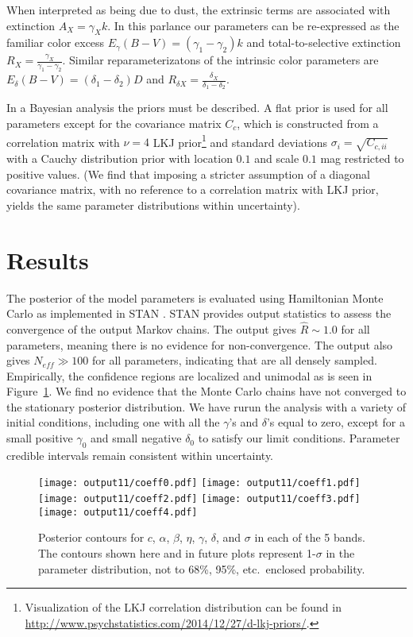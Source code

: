 \documentclass{aastex}   	%
\begin{document}
When interpreted as being due to dust, the extrinsic terms are associated with extinction $A_X = \gamma_X k$.  In
this parlance our parameters can be re-expressed as the  familiar color excess
$E_\gamma(B-V) = (\gamma_1-\gamma_2) k$ and total-to-selective extinction $R_X = \frac{\gamma_X}{\gamma_1-\gamma_2}$.
Similar reparameterizatons of the intrinsic color parameters are
$E_\delta(B-V) = (\delta_1-\delta_2) D$ and $R_{\delta X} = \frac{\delta_X}{\delta_1-\delta_2}$.

In a Bayesian analysis the priors must be described.  A flat prior is used for all parameters except
for the covariance matrix $C_c$, which is constructed from a correlation matrix with  $\nu=4$  LKJ prior\footnote{
Visualization of the LKJ correlation distribution can be found in \url{http://www.psychstatistics.com/2014/12/27/d-lkj-priors/}.}
\citep{Lewandowski20091989} and standard
deviations $\sigma_i = \sqrt{C_{c,ii}}$ with a  Cauchy distribution prior with location
 $0.1$ and scale $0.1$ mag restricted to positive values.  (We find that imposing a stricter assumption of a
 diagonal covariance matrix, with no reference to a correlation matrix with LKJ prior, yields the same parameter distributions within
 uncertainty).

\section{Results}
\label{results:sec}
The posterior of the model parameters is evaluated using Hamiltonian Monte Carlo as implemented in
STAN \citep{stan}. STAN provides output statistics to assess
the convergence of the output Markov chains.  The output gives $\hat{R} \sim 1.0$ for all parameters, meaning there is no evidence for non-convergence.  The
output also gives  $N_{eff} \gg 100$ for all parameters, indicating that are all densely sampled.
Empirically, the confidence regions are localized and unimodal as is seen in  Figure~\ref{global:fig}.  We find no evidence that
the Monte Carlo chains have not converged to the stationary posterior distribution.
We have rurun the analysis with a variety of initial conditions, including one with all the $\gamma$'s and $\delta$'s equal to zero, except for a small positive 
$\gamma_0$ and small negative $\delta_0$ to satisfy our limit conditions.  Parameter credible intervals
remain consistent within uncertainty.

\begin{figure}[htbp] %
   \centering
   \texttt{[image: output11/coeff0.pdf]} 
   \texttt{[image: output11/coeff1.pdf]} 
   \texttt{[image: output11/coeff2.pdf]} 
      \texttt{[image: output11/coeff3.pdf]} 
         \texttt{[image: output11/coeff4.pdf]} 
            \caption{Posterior contours for $c$, $\alpha$, $\beta$, $\eta$, $\gamma$, $\delta$, and $\sigma$ in each of the 5 bands.
            The contours shown here and in future plots represent 1-$\sigma$ in the parameter distribution, not to 68\%, 95\%, etc.\
            enclosed probability.  \label{global:fig}}
\end{figure}
\end{document}
